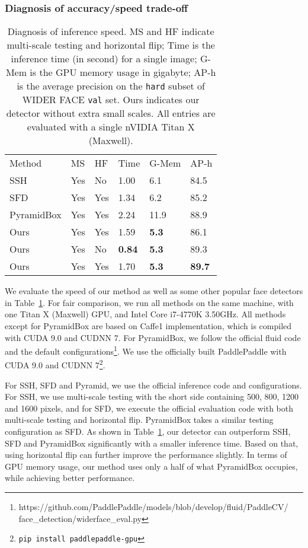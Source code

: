\documentclass[10pt,twocolumn,letterpaper]{article}
\begin{document}
\subsubsection*{Diagnosis of accuracy/speed trade-off}
\begin{table}[!t]
\centering
\begin{tabular}{|l|l|l|l|l|l|}
\hline
Method     & MS  & HF  & Time & G-Mem & AP-h   \\ \hhline{|=|=|=|=|=|=|}
SSH        & Yes & No  & 1.00 & 6.1        & 84.5 \\ \hline
SFD       & Yes & Yes & 1.34 & 6.2        & 85.2 \\ \hline
PyramidBox & Yes & Yes & 2.24 & 11.9       & 88.9 \\ \hline
Ours       & Yes & Yes  & 1.59 & \bf{5.3}        & 86.1    \\ \hline
Ours       & Yes & No  & \bf{0.84} & \bf{5.3}        &  89.3\\ \hline
Ours       & Yes & Yes & 1.70 & \bf{5.3}        &  \bf{89.7}    \\ \hline
\end{tabular}
\caption{Diagnosis of inference speed. MS and HF indicate multi-scale testing and
horizontal flip; Time is the inference time (in second) for a single image;
G-Mem is the GPU memory usage in gigabyte;
AP-h is the average precision on the \texttt{hard} subset of WIDER FACE
\texttt{val} set. Ours indicates our detector without extra small scales.
All entries are evaluated with a single nVIDIA Titan X (Maxwell).\label{tbl:speed}}
\end{table}
We evaluate the speed of our method as well as some other popular face detectors in
Table~\ref{tbl:speed}. For fair comparison, we run all methods on the same machine,
with one Titan X (Maxwell) GPU, and Intel Core i7-4770K 3.50GHz. All methods
except for PyramidBox are based on Caffe1 implementation, which is compiled with CUDA 9.0 and CUDNN 7.
For PyramidBox, we follow the official fluid code and the default configurations\footnote{https://github.com/PaddlePaddle/models/blob/develop/fluid/PaddleCV/\\
face\_detection/widerface\_eval.py}. We
use the officially built PaddlePaddle with CUDA 9.0 and CUDNN 7\footnote{\texttt{pip install paddlepaddle-gpu}}.

For SSH, SFD and Pyramid, we use the official inference code and configurations. For SSH,
we use multi-scale testing with the short side containing 500, 800, 1200 and 1600
pixels, and for SFD, we execute the official evaluation code with both multi-scale
testing and horizontal flip. PyramidBox takes a similar testing configuration as SFD.
As shown in Table~\ref{tbl:speed}, our detector can
outperform SSH, SFD and PyramidBox significantly with a smaller inference time. Based on that,
using horizontal flip can further improve the performance slightly.
In terms of GPU memory usage, our method uses only a half of what PyramidBox occupies,
while achieving better performance.
\end{document}
